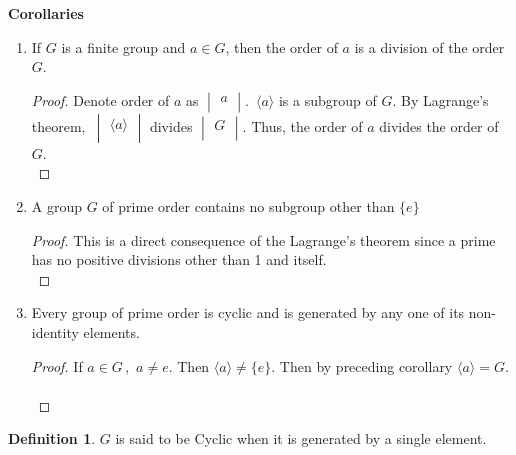 \documentclass[11pt,a4paper]{article}
\theoremstyle{definition}
\newtheorem{defn}[thm]{Definition}
\begin{document}
\textbf{Corollaries}
\begin{enumerate}
\item If $G$ is a finite group and $a\in G$, then the order of $a$ is a division of the order $G$.\\

\begin{proof}
Denote order of $a$ as $\begin{vmatrix}
a\\
\end{vmatrix}$. $\, \langle a\rangle$ is a subgroup of $G$. By Lagrange's theorem, $\, \begin{vmatrix}
\langle a \rangle\\
\end{vmatrix}$ divides $\begin{vmatrix}
G\\
\end{vmatrix}$. Thus, the order of $a$ divides the order of $G$.\\
\end{proof}


\item A group $G$ of prime order contains no subgroup other than $\{e\}$\\

\begin{proof}
This is a direct consequence of the Lagrange's theorem since a prime has no positive divisions other than 1 and itself.\\
\end{proof}


\item Every group of prime order is cyclic and is generated by any one of its non-identity elements.\\

\begin{proof}
If $a\in G\, ,\, \, a\neq e$. Then $\langle a\rangle \neq \{e\}$. Then by preceding corollary $\langle a\rangle = G$.\\\\
\end{proof}
\end{enumerate}





\begin{defn}
$G$ is said to be Cyclic when it is generated by a single element.\\\\
\end{defn}
\end{document}
